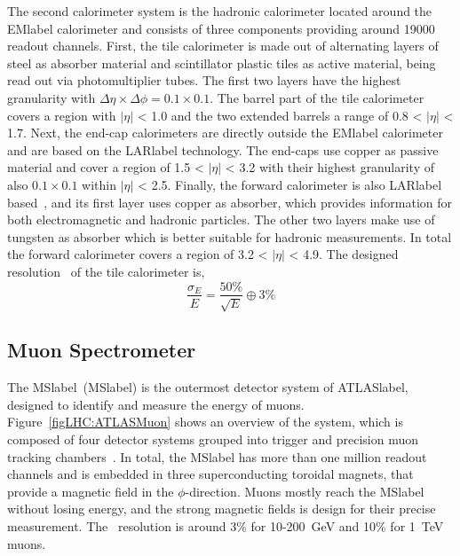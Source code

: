 The second calorimeter system is the hadronic calorimeter located around the \acrshort{EMlabel} calorimeter and consists of three components providing around 19000 readout channels. First, the tile calorimeter is made out of alternating layers of steel as absorber material and scintillator plastic tiles as active material, being read out via photomultiplier tubes. The first two layers have the highest granularity with $\Delta\eta\times\Delta\phi= 0.1\times 0.1$. The barrel part of the tile calorimeter covers a region with $|\eta|$ < 1.0 and the two extended barrels a range of 0.8 < $|\eta|$ < 1.7.
Next, the end-cap calorimeters are directly outside the \acrshort{EMlabel} calorimeter and are based on the \acrshort{LARlabel} technology. The end-caps use copper as passive material and cover a region of 1.5 < $|\eta|$ < 3.2 with their highest granularity of also $0.1\times 0.1$ within $|\eta|$ < 2.5. Finally, the forward calorimeter is also \acrshort{LARlabel} based~\cite{Artamonov_2008}, and its first layer uses copper as absorber, which provides information for both electromagnetic and hadronic particles. The other two layers make use of tungsten as absorber which is better suitable for hadronic measurements. In total the forward calorimeter covers a region of 3.2 < $|\eta|$ < 4.9.
The designed resolution~\cite{Collaboration_2008} of the tile calorimeter is,
\begin{equation}
    \frac{\sigma_E}{E} = \frac{50\%}{\sqrt{E}}\oplus 3\%
\end{equation}


\subsection{Muon Spectrometer}

The \acrlong{MSlabel}~(\acrshort{MSlabel}) is the outermost detector system of \acrshort{ATLASlabel}, designed to identify and measure the energy of muons. Figure~\ref{figLHC:ATLASMuon} shows an overview of the system, which is composed of four detector systems grouped into trigger and precision muon tracking chambers~\cite{CERN-LHCC-97-022,muoncommission}. In total, the \acrshort{MSlabel} has more than one million readout channels and is embedded in three superconducting toroidal magnets, that provide a magnetic field in the $\phi$-direction. Muons mostly reach the \acrshort{MSlabel} without losing energy, and the strong magnetic fields is design for their precise measurement. The \pT\ resolution is around 3\% for 10-200~GeV and 10\% for 1~TeV muons. 

